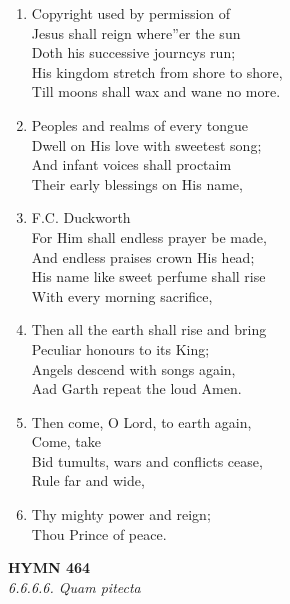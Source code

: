 \documentclass[11pt,a4paper]{article}
\begin{document}
\begin{enumerate}
    \item Copyright used by permission of \\
        Jesus shall reign where''er the sun \\
        Doth his successive journcys run; \\
        His kingdom stretch from shore to shore, \\
        Till moons shall wax and wane no more.

    \item Peoples and realms of every tongue \\
        Dwell on His love with sweetest song; \\
        And infant voices shall proctaim \\
        Their early blessings on His name,

    \item F.C. Duckworth \\
        For Him shall endless prayer be made, \\
        And endless praises crown His head; \\
        His name like sweet perfume shall rise \\
        With every morning sacrifice,

    \item Then all the earth shall rise and bring \\
        Peculiar honours to its King; \\
        Angels descend with songs again, \\
        Aad Garth repeat the loud Amen.

    \item Then come, O Lord, to earth again, \\
        Come, take \\
        Bid tumults, wars and conflicts cease, \\
        Rule far and wide,

    \item Thy mighty power and reign; \\
        Thou Prince of peace.

\end{enumerate}

\newpage
\begin{center}
    {\Large \textbf{HYMN 464}}
    \\
    \textit{6.6.6.6. Quam pitecta}
\end{center}
\vspace{1em}
\end{document}
